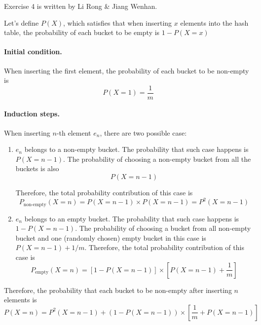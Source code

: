 


\def\HWTITLE{Homework 6}
\def\COURSECODE{CS 225: Data Structures}
\def\AUTHOR{Group D1}



\makeMyTitle

Exercise 4 is written by Li Rong \& Jiang Wenhan.

\thispagestyle{firstPage}

\begin{questions}



    Let's define $P(X)$, which satisfies that when inserting $x$ elements into the hash table, the probability of each bucket to be empty is $1-P(X=x)$

    \paragraph{Initial condition.} When inserting the first element, the probability of each bucket to be non-empty is
    \[P(X=1)=\frac{1}{m}\]

    \paragraph{Induction steps.} When inserting $n$-th element $e_n$, there are two possible case:

    \begin{enumerate}
        \item $e_n$ belongs to a non-empty bucket. The probability that such case happens is $P(X=n-1)$. The probability of choosing a non-empty bucket from all the buckets is also \[P(X=n-1)\]
        
        Therefore, the total probability contribution of this case is \[P_\text{non-empty}(X=n)=P(X=n-1)\times P(X=n-1) = P^2(X=n-1)\]
        
        \item $e_n$ belongs to an empty bucket. The probability that such case happens is $1-P(X=n-1)$. The probability of choosing a bucket from all non-empty bucket and one (randomly chosen) empty bucket in this case is $P(X=n-1) + 1/m$. Therefore, the total probability contribution of this case is \[P_\text{empty}(X=n)=\left[ 1-P(X=n-1) \right]\times \left[P(X=n-1) + \frac{1}{m}\right]\]
    \end{enumerate}

    Therefore, the probability that each bucket to be non-empty after inserting $n$ elements is \[ P(X=n) = P^2(X=n-1) + (1-P(X=n-1))\times \left[ \frac{1}{m} + P(X=n-1)\right]\]


\end{questions}
